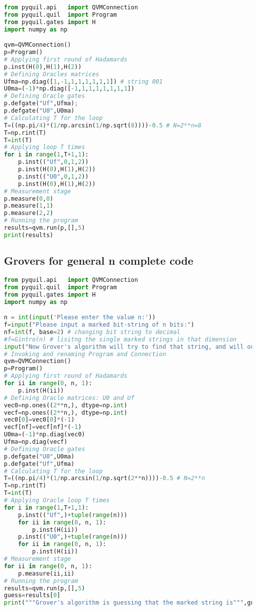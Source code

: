 \begin{lstlisting}[language=Python,caption={Grover's algorithm with pyQuil ($n=3$)},label={lst:DAqvm},frame=single]
from pyquil.api   import QVMConnection
from pyquil.quil  import Program
from pyquil.gates import H
import numpy as np

qvm=QVMConnection()
p=Program()
# Applying first round of Hadamards
p.inst(H(0),H(1),H(2))
# Defining Oracles matrices
Ufma=np.diag([1,-1,1,1,1,1,1,1]) # string 001
U0ma=(-1)*np.diag([-1,1,1,1,1,1,1,1])
# Defining Oracle gates
p.defgate("Uf",Ufma);
p.defgate("U0",U0ma)
# Calculating T for the loop
T=((np.pi/4)*(1/np.arcsin(1/np.sqrt(8))))-0.5 # N=2**n=8
T=np.rint(T)
T=int(T)
# Applying loop T times
for i in range(1,T+1,1): 
    p.inst(("Uf",0,1,2)) 
    p.inst(H(0),H(1),H(2))
    p.inst(("U0",0,1,2))
    p.inst(H(0),H(1),H(2))
# Measurement stage
p.measure(0,0)
p.measure(1,1)
p.measure(2,2)
# Running the program
results=qvm.run(p,[],5)
print(results)
\end{lstlisting}


\subsection{Grovers for general n complete code}

\begin{lstlisting}[language=Python,caption={Grover's algorithm with pyQuil single-marked (general $n$)},label={lst:DAqvm},frame=single]
from pyquil.api   import QVMConnection
from pyquil.quil  import Program
from pyquil.gates import H
import numpy as np

n = int(input('Please enter the value n:'))
f=input("Please input a marked bit-string of n bits:") 
nf=int(f, base=2) # changing bit string to decimal
#f=Gintro(n) # lisitng the single marked strings in that dimension
input("Now Grover's algorithm will try to find that string, and will output a guess.")
# Invoking and renaming Program and Connection
qvm=QVMConnection()
p=Program()
# Applying first round of Hadamards
for ii in range(0, n, 1):
    p.inst(H(ii))
# Defining Oracle matrices: U0 and Uf
vec0=np.ones((2**n,), dtype=np.int)
vecf=np.ones((2**n,), dtype=np.int)
vec0[0]=vec0[0]*(-1)
vecf[nf]=vecf[nf]*(-1)
U0ma=(-1)*np.diag(vec0) 
Ufma=np.diag(vecf) 
# Defining Oracle gates
p.defgate("U0",U0ma)
p.defgate("Uf",Ufma)
# Calculating T for the loop
T=((np.pi/4)*(1/np.arcsin(1/np.sqrt(2**n))))-0.5 # N=2**n
T=np.rint(T)
T=int(T)
# Applying Oracle loop T times
for i in range(1,T+1,1):
    p.inst(("Uf",)+tuple(range(n)))
    for ii in range(0, n, 1):
        p.inst(H(ii))
    p.inst(("U0",)+tuple(range(n)))
    for ii in range(0, n, 1):
        p.inst(H(ii))
# Measurement stage
for ii in range(0, n, 1):
    p.measure(ii,ii)
# Running the program
results=qvm.run(p,[],5)
guess=results[0]
print("""Grover's algorithm is guessing that the marked string is""",guess)
\end{lstlisting}

